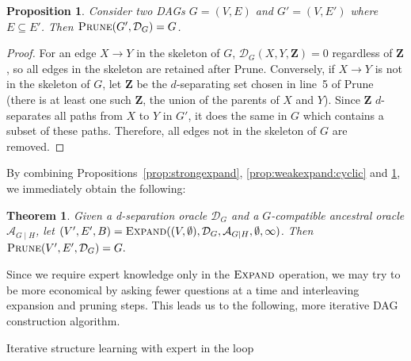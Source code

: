 \documentclass[accepted]{uai2025} %
\newtheorem{proposition}{Proposition}
\newtheorem{theorem}{Theorem}
\begin{document}
\begin{proposition}
Consider two DAGs $G=(V,E)$ and $G'=(V,E')$ where $E \subseteq E'$. 
Then $\textsc{Prune}(G',\mathcal{D}_G)=G$.
\label{prop:prune}
\end{proposition}

\begin{proof}
For an edge $X \to Y$ in the skeleton of $G$, 
$\mathcal{D}_G(X, Y, \mathbf{Z}) = 0$ regardless 
of $\mathbf{Z}$, so all edges in the skeleton are 
retained after {\sc Prune}. Conversely, if 
 $X \to Y$ is not in the skeleton of $G$, let 
$\mathbf{Z}$ be the $d$-separating set chosen 
in line~5 of {\sc Prune} (there is at least one 
such $\mathbf{Z}$, the union of the parents of 
$X$ and $Y$). Since  $\mathbf{Z}$ $d$-separates 
all paths from $X$ to $Y$ in $G'$, it does the same 
in $G$ which contains a subset of these paths. 
Therefore, all edges not in the skeleton of $G$ are 
removed.
\end{proof}

By combining Propositions~\ref{prop:strongexpand}, 
\ref{prop:weakexpand:cyclic} and 
\ref{prop:prune}, we immediately obtain the following:

\begin{theorem}
Given a d-separation oracle $\mathcal{D}_G$ and a $G$-compatible 
ancestral oracle $\mathcal{A}_{G\mid H}$, 
let $(V',E',B)=\textsc{Expand}((V,\emptyset),\mathcal{D}_G,\mathcal{A}_{G\mid H},\emptyset,\infty)$.
Then $\textsc{Prune}(V',E',\mathcal{D}_G)=G.$
\end{theorem}

Since we require expert knowledge only in the $\textsc{Expand}$ 
operation, we may try to be more economical by asking fewer 
questions at a time and interleaving expansion and
pruning steps. This leads us to the following, more iterative 
DAG construction algorithm.

\begin{algorithm}[h]
\DontPrintSemicolon
\SetAlgoLined
{}


\caption{Iterative structure learning with expert in the loop}
\label{algo:expert}
\end{algorithm} 
\end{document}
